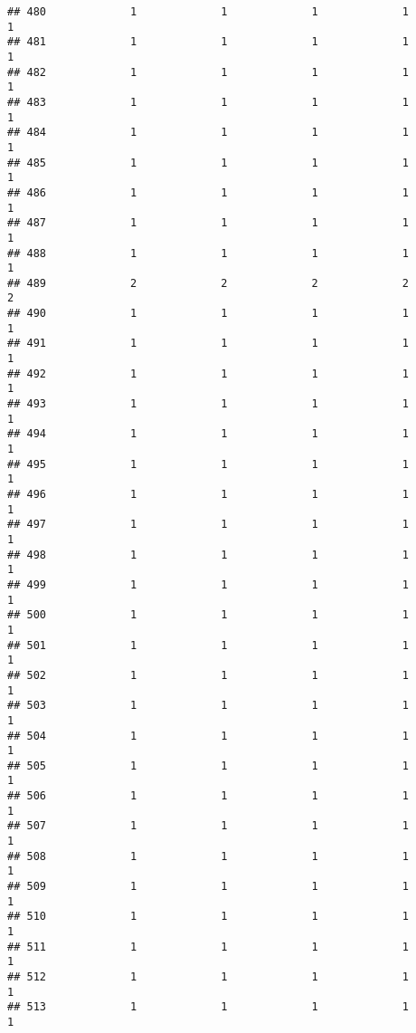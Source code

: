 \documentclass[
]{article}
\begin{document}
\begin{verbatim}
## 480             1             1             1             1             1
## 481             1             1             1             1             1
## 482             1             1             1             1             1
## 483             1             1             1             1             1
## 484             1             1             1             1             1
## 485             1             1             1             1             1
## 486             1             1             1             1             1
## 487             1             1             1             1             1
## 488             1             1             1             1             1
## 489             2             2             2             2             2
## 490             1             1             1             1             1
## 491             1             1             1             1             1
## 492             1             1             1             1             1
## 493             1             1             1             1             1
## 494             1             1             1             1             1
## 495             1             1             1             1             1
## 496             1             1             1             1             1
## 497             1             1             1             1             1
## 498             1             1             1             1             1
## 499             1             1             1             1             1
## 500             1             1             1             1             1
## 501             1             1             1             1             1
## 502             1             1             1             1             1
## 503             1             1             1             1             1
## 504             1             1             1             1             1
## 505             1             1             1             1             1
## 506             1             1             1             1             1
## 507             1             1             1             1             1
## 508             1             1             1             1             1
## 509             1             1             1             1             1
## 510             1             1             1             1             1
## 511             1             1             1             1             1
## 512             1             1             1             1             1
## 513             1             1             1             1             1

\end{verbatim}
\end{document}
